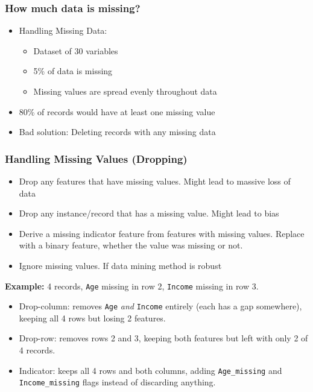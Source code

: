 \begin{frame}[fragile]\frametitle{How much data is missing?}	
\begin{itemize}
\item Handling Missing Data:
	\begin{itemize}
	\item Dataset of 30 variables
	\item 5\% of data is missing
	\item Missing values are spread evenly throughout data
	\end{itemize}
\item 80\% of records would have at least one missing value
\item Bad solution: Deleting records with any missing data
\end{itemize}
\end{frame}

\begin{frame}[fragile]\frametitle{Handling Missing Values (Dropping)}
\begin{itemize}
\item Drop any features that have missing values. Might lead to massive loss of data
\item Drop any instance/record that has a missing value. Might lead to bias
\item Derive a missing indicator feature from features with missing values. Replace with a binary feature, whether the value was missing or not.
\item Ignore missing values. If data mining method is robust
\end{itemize}
\textbf{Example:} 4 records, \texttt{Age} missing in row 2, \texttt{Income} missing in row 3.
\begin{itemize}
\item Drop-column: removes \texttt{Age} \emph{and} \texttt{Income} entirely (each has a gap
  somewhere), keeping all 4 rows but losing 2 features.
\item Drop-row: removes rows 2 and 3, keeping both features but left with only 2 of 4
  records.
\item Indicator: keeps all 4 rows and both columns, adding \texttt{Age\_missing} and
  \texttt{Income\_missing} flags instead of discarding anything.
\end{itemize}
\end{frame}

